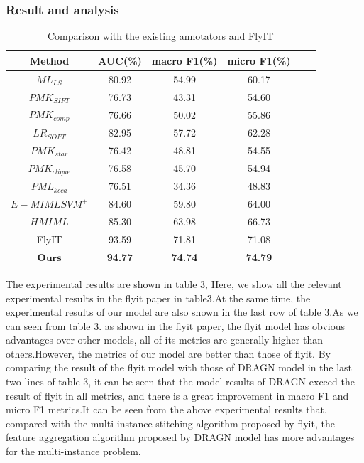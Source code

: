 \documentclass[10pt,twocolumn,letterpaper]{article}
\begin{document}
\subsubsection{Result and analysis}

\begin{table}
\footnotesize
\begin{center}
\begin{tabular}{|c|c|c|c|c|c|}
\hline
Method & AUC(\%) & macro F1(\%)  & micro F1(\%)\\
\hline\hline
$ML_{LS}$ & 80.92 & 54.99 & 60.17 \\
$PMK_{SIFT}$ & 76.73 & 43.31 & 54.60 \\
$PMK_{comp}$ & 76.66 & 50.02 & 55.86 \\
$LR_{SOFT}$ & 82.95 & 57.72 & 62.28 \\
$PMK_{star}$ & 76.42 & 48.81 & 54.55 \\

$PMK_{clique}$ & 76.58 & 45.70 & 54.94 \\
$PML_{kcca}$ & 76.51 & 34.36 & 48.83 \\
$E-MIMLSVM^{+}$ & 84.60 & 59.80 & 64.00 \\
$HMIML$ & 85.30 & 63.98 & 66.73 \\
FlyIT & 93.59 & 71.81 & 71.08 \\ \hline 
$\textbf{Ours}$ & \textbf{94.77} & \textbf{74.74} & \textbf{74.79} \\
\hline
\end{tabular}
\end{center}
\caption{Comparison with the existing annotators and FlyIT}
\end{table}

The experimental results are shown in table 3, Here, we show all the relevant experimental results in the flyit paper in table3.At the same time, the experimental results of our model are also shown in the last row of table 3.As we can seen from table 3. as shown in the flyit paper, the flyit model has obvious advantages over other models, all of its metrics are generally higher than others.However, the metrics of our model are better than those of flyit. By comparing the result of the flyit model with those of DRAGN model in the last two lines of table 3, it can be seen that the model results of DRAGN exceed the result of flyit in all metrics, and there is a great improvement in macro F1 and micro F1 metrics.It can be seen from the above experimental results that, compared with the multi-instance stitching algorithm proposed by flyit, the feature aggregation algorithm proposed by DRAGN model has more advantages for the multi-instance problem.
\end{document}
